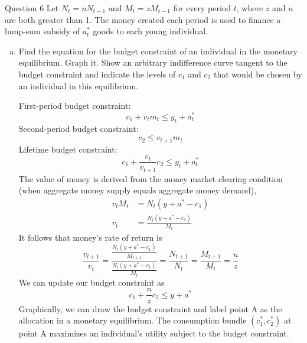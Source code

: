 \documentclass[a4paper]{article}
\newif\IfInSansMode
\numberwithin{equation}{section}
\numberwithin{figure}{section}
\begin{document}
	\begin{questionbox}{Question 6}
		Let \( N_t = nN_{t-1} \) and \( M_t = zM_{t-1} \) for every period \( t \), where \( z \) and  \( n \) are both greater than 1. The money created each period is used to finance a lump-sum subsidy of \( a_t^* \) goods to each young individual.
		\begin{enumerate}[(a)]
			\item Find the equation for the budget constraint of an individual in the monetary equilibrium. Graph it. Show an arbitrary indifference curve tangent to the budget constraint and indicate the levels of \( c_1 \) and \( c_2 \) that would be chosen by an individual in this equilibrium.
			\begin{explanationbox}
				First-period budget constraint:
				\[
					c_1 + v_tm_t \leq y_t + a_t^*
				\]
				Second-period budget constraint:
				\[
					c_2 \leq v_{t+1}m_t
				\]
				Lifetime budget constraint:
				\[
					c_1+\frac{v_t}{v_{t+1}}c_2\leq y_t + a_t^*
				\]
				The value of money is derived from the money market clearing condition (when aggregate money supply equals aggregate money demand),
				\begin{align*}
					v_tM_t &= N_t(y+a^*-c_1)\\
					v_t &= \frac{N_t(y+a^*-c_1)}{M_t}
				\end{align*}
				It follows that money's rate of return is
				\[
					\frac{v_{t+1}}{v_t} = \frac{\frac{N_t(y+a^*-c_1)}{M_{t+1}}}{\frac{N_t(y+a^*-c_1)}{M_t}} = \frac{N_{t+1}}{N_t} = \frac{M_{t+1}}{M_t} = \frac{n}{z}
				\]
				We can update our budget constraint as
				\[
					c_1 + \frac{n}{z}c_2 \leq y + a^*
				\]
				Graphically, we can draw the budget constraint and label point A as the allocation in a monetary equilibrium. The consumption bundle \( (c_1^*,c_2^*) \) at point A maximizes an individual's utility subject to the budget constraint.
			\end{explanationbox}
			\begin{explanationbox}
				\begin{figure}[H]
					\centering
\end{figure}
\end{explanationbox}
\end{enumerate}
\end{questionbox}
\end{document}
